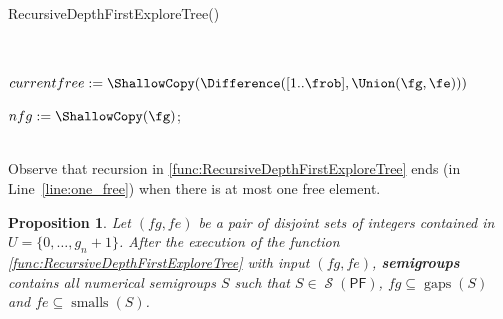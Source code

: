 \documentclass[11pt]{amsart}
\newtheorem{proposition}[theorem]{Proposition}
\theoremstyle{remark}
\begin{document}
\begin{function}[ht]\caption{RecursiveDepthFirstExploreTree()\label{func:RecursiveDepthFirstExploreTree}}
\RecursiveDepthFirstExploreTreew{$[\fg,\fe]$}\\
\\
    $currentfree := \ShallowCopy(\Difference([1..\frob],\Union(\fg,\fe)))$\;

    $nfg := \ShallowCopy(\fg)$; \\
\\
\nl\label{line:single_free}     
\end{function}
Observe that recursion in \ref{func:RecursiveDepthFirstExploreTree} ends (in Line~\ref{line:one_free}) when there is at most one free element. 
\begin{proposition}\label{prop:correction_recursive_function}
Let $(fg,fe)$ be a pair of disjoint sets of integers contained in $U=\{0,\ldots,g_n+1\}$. 
After the execution of the function \ref{func:RecursiveDepthFirstExploreTree} with input $(fg,fe)$, 
\textbf{semigroups} contains all numerical semigroups $S$ such that  $S\in \operatorname{\mathcal{S}}({\ensuremath{\mathsf{PF}}})$, $fg\subseteq \operatorname{gaps}(S)$ and $fe\subseteq \operatorname{smalls}(S)$.
\end{proposition}
\end{document}
